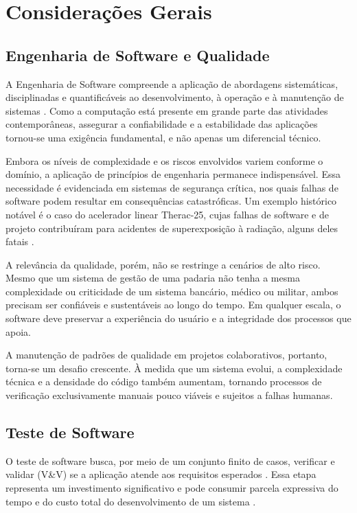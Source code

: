 \chapter{Considerações Gerais}
\label{cap:02}

\section{Engenharia de Software e Qualidade}

A Engenharia de Software compreende a aplicação de abordagens sistemáticas, disciplinadas e quantificáveis ao desenvolvimento, à operação e à manutenção de sistemas \cite{Valente2020}. Como a computação está presente em grande parte das atividades contemporâneas, assegurar a confiabilidade e a estabilidade das aplicações tornou-se uma exigência fundamental, e não apenas um diferencial técnico.

Embora os níveis de complexidade e os riscos envolvidos variem conforme o domínio, a aplicação de princípios de engenharia permanece indispensável. Essa necessidade é evidenciada em sistemas de segurança crítica, nos quais falhas de software podem resultar em consequências catastróficas. Um exemplo histórico notável é o caso do acelerador linear Therac-25, cujas falhas de software e de projeto contribuíram para acidentes de superexposição à radiação, alguns deles fatais \cite{turner1993investigation}.

A relevância da qualidade, porém, não se restringe a cenários de alto risco. Mesmo que um sistema de gestão de uma padaria não tenha a mesma complexidade ou criticidade de um sistema bancário, médico ou militar, ambos precisam ser confiáveis e sustentáveis ao longo do tempo. Em qualquer escala, o software deve preservar a experiência do usuário e a integridade dos processos que apoia.

A manutenção de padrões de qualidade em projetos colaborativos, portanto, torna-se um desafio crescente. À medida que um sistema evolui, a complexidade técnica e a densidade do código também aumentam, tornando processos de verificação exclusivamente manuais pouco viáveis e sujeitos a falhas humanas.

\section{Teste de Software}

O teste de software busca, por meio de um conjunto finito de casos, verificar e validar (V\&V) se a aplicação atende aos requisitos esperados \cite{Valente2020}. Essa etapa representa um investimento significativo e pode consumir parcela expressiva do tempo e do custo total do desenvolvimento de um sistema \cite{Myers2014}.

